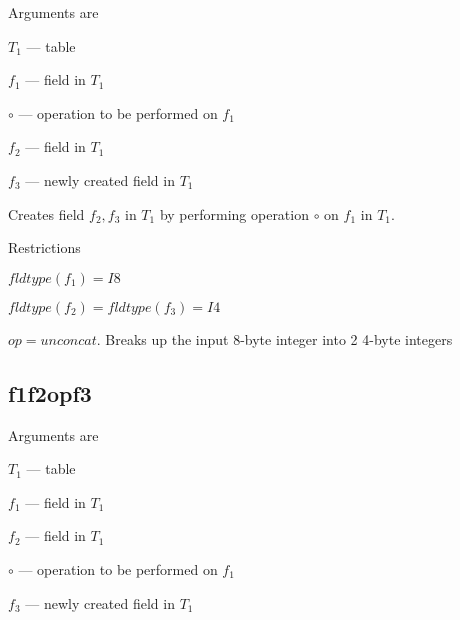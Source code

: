 \documentclass{report}
\begin{document}
Arguments are 
\be
\item \(T_1\) --- table
\item \(f_1\) --- field in \(T_1\)
\item \(\circ\)  --- operation to be performed on \(f_1\)
\item \(f_2\) --- field in \(T_1\)
\item \(f_3\) --- newly created field in \(T_1\)
\ee

Creates field \(f_2, f_3\) in \(T_1\) by performing operation \(\circ\) on
\(f_1\) in \(T_1\). 

Restrictions
\be
\item \(fldtype(f_1) = I8\)
\item \(fldtype(f_2) = fldtype(f_3)= I4\)
\item \(op = unconcat\). Breaks up the input 8-byte integer into 2
4-byte integers
\ee

\subsection{f1f2opf3}
\label{f1f2opf3}

Arguments are 
\be
\item \(T_1\) --- table
\item \(f_1\) --- field in \(T_1\)
\item \(f_2\) --- field in \(T_1\)
\item \(\circ\)  --- operation to be performed on \(f_1\)
\item \(f_3\) --- newly created field in \(T_1\)
\ee
\end{document}
